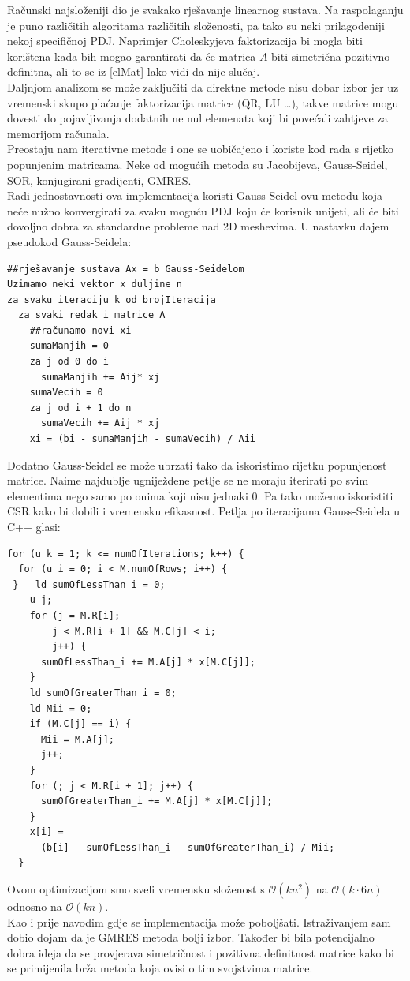 \documentclass[zavrsnirad]{../fer}
\begin{document}
Računski najsloženiji dio je svakako rješavanje linearnog 
sustava. Na raspolaganju je puno različitih algoritama različitih 
složenosti, pa tako su neki prilagođeniji nekoj specifičnoj PDJ.
Naprimjer Choleskyjeva faktorizacija bi mogla biti korištena kada
bih mogao garantirati da će matrica $A$ biti simetrična pozitivno 
definitna, ali to se iz \ref{elMat} 
lako vidi da nije slučaj.
\bigskip
\\ 
Daljnjom analizom se može zaključiti da direktne metode nisu dobar
izbor jer uz vremenski skupo plaćanje faktorizacija matrice (QR, LU \dots),
takve matrice mogu dovesti do pojavljivanja dodatnih ne nul elemenata 
koji bi povećali zahtjeve za memorijom računala.
\bigskip
\\ 
Preostaju nam iterativne metode i one se uobičajeno i koriste kod 
rada s rijetko popunjenim matricama. Neke od mogućih metoda su 
Jacobijeva, Gauss-Seidel, SOR, konjugirani gradijenti, GMRES.
\bigskip
\\
Radi jednostavnosti ova implementacija koristi Gauss-Seidel-ovu metodu 
koja neće nužno konvergirati za svaku moguću PDJ koju će korisnik unijeti,
ali će biti dovoljno dobra za standardne probleme nad 2D meshevima.
U nastavku dajem pseudokod Gauss-Seidela:
\begin{verbatim}
##rješavanje sustava Ax = b Gauss-Seidelom
Uzimamo neki vektor x duljine n
za svaku iteraciju k od brojIteracija
  za svaki redak i matrice A
    ##računamo novi xi
    sumaManjih = 0
    za j od 0 do i 
      sumaManjih += Aij* xj
    sumaVecih = 0
    za j od i + 1 do n
      sumaVecih += Aij * xj
    xi = (bi - sumaManjih - sumaVecih) / Aii 
\end{verbatim}
Dodatno Gauss-Seidel se može ubrzati tako da iskoristimo rijetku popunjenost
matrice. Naime najdublje ugniježdene petlje se ne moraju iterirati po svim elementima
nego samo po onima koji nisu jednaki $0$. Pa tako možemo iskoristiti CSR kako
bi dobili i vremensku efikasnost. Petlja po iteracijama Gauss-Seidela u C++ glasi:
\begin{verbatim}
for (u k = 1; k <= numOfIterations; k++) {
  for (u i = 0; i < M.numOfRows; i++) {
 }   ld sumOfLessThan_i = 0;
    u j;
    for (j = M.R[i];
        j < M.R[i + 1] && M.C[j] < i;
        j++) {
      sumOfLessThan_i += M.A[j] * x[M.C[j]];
    }
    ld sumOfGreaterThan_i = 0;
    ld Mii = 0;
    if (M.C[j] == i) {
      Mii = M.A[j];
      j++;
    } 
    for (; j < M.R[i + 1]; j++) {
      sumOfGreaterThan_i += M.A[j] * x[M.C[j]];
    }
    x[i] = 
      (b[i] - sumOfLessThan_i - sumOfGreaterThan_i) / Mii; 
  }
\end{verbatim}
Ovom optimizacijom smo sveli vremensku složenost s 
$\mathcal{O}(k n^2)$ na $\mathcal{O}(k \cdot 6n)$ odnosno na $\mathcal{O}(k n)$.
\bigskip
\\
Kao i prije navodim gdje se implementacija može poboljšati. Istraživanjem 
sam dobio dojam da je GMRES metoda bolji izbor. Također bi bila
potencijalno dobra 
ideja da se provjerava simetričnost i pozitivna definitnost matrice 
kako bi se primijenila brža metoda koja ovisi o tim svojstvima 
matrice.
\end{document}
